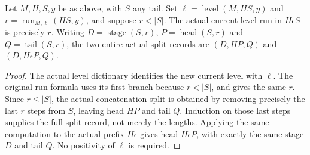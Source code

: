 \begin{theorem}
\label{hir:original-interior-selected-all-level-short-splits}
\leanok
{}
Let $M,H,S,y$ be as above, with $S$ any tail.  Set
$\ell=\operatorname{level}(M,HS,y)$ and
$r=\operatorname{run}_{M,\ell}(HS,y)$, and suppose $r<|S|$.
The actual current-level run in $H\epsilon S$ is precisely $r$.
Writing $D=\operatorname{stage}(S,r)$, $P=\operatorname{head}(S,r)$ and
$Q=\operatorname{tail}(S,r)$, the two entire actual split records are
$(D,HP,Q)$ and $(D,H\epsilon P,Q)$.
\end{theorem}
\begin{proof}
The actual level dictionary identifies the new current level with $\ell$.
The original run formula uses its first branch because $r<|S|$, and gives
the same $r$.  Since $r\leq|S|$, the actual concatenation split is obtained
by removing precisely the last $r$ steps from $S$, leaving head $HP$ and
tail $Q$.  Induction on those last steps supplies the full split record,
not merely the lengths.  Applying the same computation to the actual
prefix $H\epsilon$ gives head $H\epsilon P$, with exactly the same stage
$D$ and tail $Q$.  No positivity of $\ell$ is required.
\end{proof}

